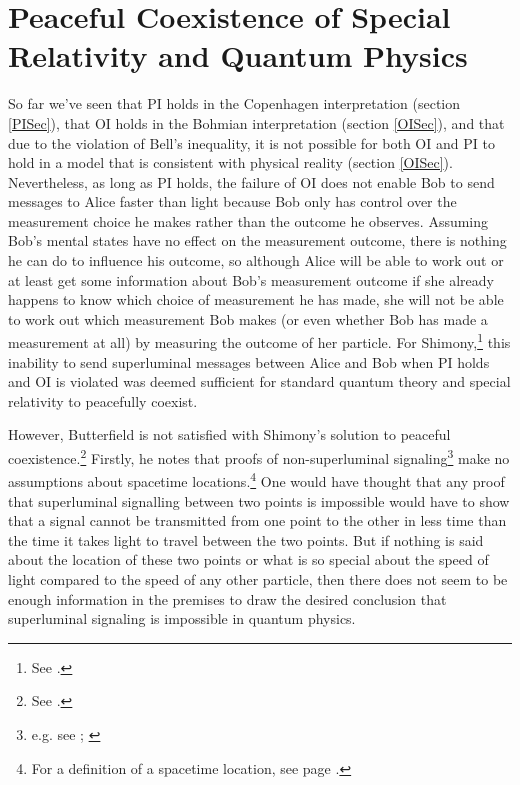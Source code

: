 \documentclass[12pt]{report}
\begin{document}

\section{Peaceful Coexistence of Special Relativity and Quantum Physics}
So far we've seen that PI holds in the Copenhagen interpretation (section \ref{PISec}), that OI holds in the Bohmian interpretation (section \ref{OISec}), and that due to the violation of Bell's inequality, it is not possible for both OI and PI to hold in a model that is consistent with physical reality (section \ref{OISec}). Nevertheless, as long as PI holds, the failure of OI does not enable Bob to send messages to Alice faster than light because Bob only has control over the measurement choice he makes rather than the outcome he observes. Assuming Bob's mental states have no effect on the measurement outcome, there is nothing he can do to influence his outcome, so although Alice will be able to work out or at least get some information about Bob's measurement outcome if she already happens to know which choice of measurement he has made, she will not be able to work out which measurement Bob makes (or even whether Bob has made a measurement at all) by measuring the outcome of her particle. For Shimony,\footnote{See \cite[146-147]{Shimony86}.} this inability to send superluminal messages between Alice and Bob when PI holds and OI is violated was deemed sufficient for  standard quantum theory and special relativity to peacefully coexist.  

However, Butterfield is not satisfied with Shimony's solution to peaceful coexistence.\footnote{See \cite[p. 12]{Butterfield}.} Firstly, he notes that proofs of non-superluminal signaling\footnote{e.g. see \cite[p. 113--116]{Redhead}; \cite[p. 139--140]{Hiley}} make no assumptions about spacetime locations.\footnote{For a definition of a spacetime location, see page \pageref{spacetimedef}.} One would have thought that any proof that superluminal signalling between two points is impossible would have to show that a signal cannot be transmitted from one point to the other in less time than the time it takes light to travel between the two points. But if nothing is said about the location of these two points or what is so special about the speed of light compared to the speed of any other particle, then there does not seem to be enough information in the premises to draw the desired conclusion that superluminal signaling is impossible in quantum physics.
\end{document}

